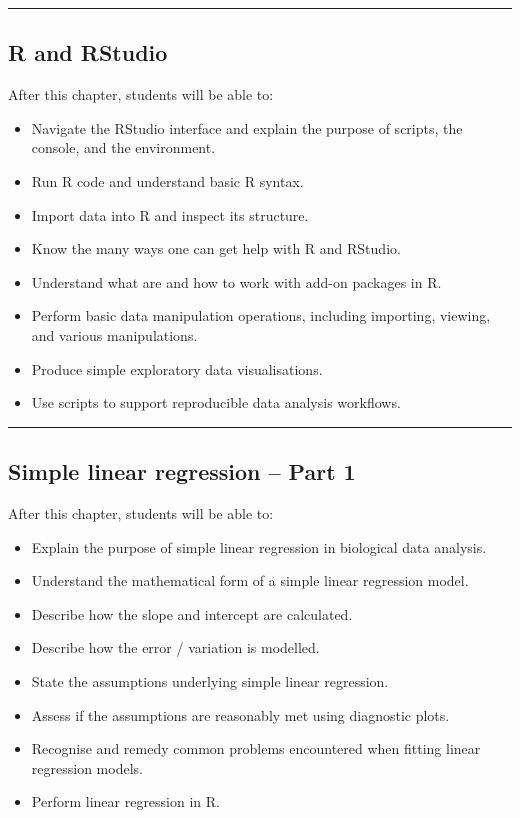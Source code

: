 \documentclass[
  letterpaper,
  8pt,
  a4paper]{book}
\providecommand{\tightlist}{%
  \setlength{\itemsep}{0pt}\setlength{\parskip}{0pt}}
\begin{document}
\begin{center}\rule{0.5\linewidth}{0.5pt}\end{center}

\subsection*{R and RStudio}\label{r-and-rstudio}

After this chapter, students will be able to:

\begin{itemize}
\tightlist
\item
  Navigate the RStudio interface and explain the purpose of scripts, the
  console, and the environment.
\item
  Run R code and understand basic R syntax.
\item
  Import data into R and inspect its structure.
\item
  Know the many ways one can get help with R and RStudio.
\item
  Understand what are and how to work with add-on packages in R.
\item
  Perform basic data manipulation operations, including importing,
  viewing, and various manipulations.
\item
  Produce simple exploratory data visualisations.
\item
  Use scripts to support reproducible data analysis workflows.
\end{itemize}

\begin{center}\rule{0.5\linewidth}{0.5pt}\end{center}

\subsection*{Simple linear regression -- Part
1}\label{simple-linear-regression-part-1}

After this chapter, students will be able to:

\begin{itemize}
\tightlist
\item
  Explain the purpose of simple linear regression in biological data
  analysis.
\item
  Understand the mathematical form of a simple linear regression model.
\item
  Describe how the slope and intercept are calculated.
\item
  Describe how the error / variation is modelled.
\item
  State the assumptions underlying simple linear regression.
\item
  Assess if the assumptions are reasonably met using diagnostic plots.
\item
  Recognise and remedy common problems encountered when fitting linear
  regression models.
\item
  Perform linear regression in R.
\end{itemize}
\end{document}
